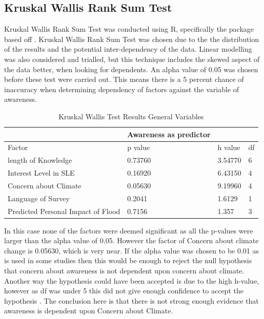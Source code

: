 \subsection{Kruskal Wallis Rank Sum Test}
Kruskal Wallis Rank Sum Test was conducted using R, specifically the package based off \cite{hollander_nonparametric_2014}. Kruskal Wallis Rank Sum Test was chosen due to the the distribution of the results and the potential inter-dependency of the data. Linear modelling was also considered and trialled, but this technique includes the skewed aspect of the data better, when looking for dependents. An alpha value of 0.05 was chosen before these test were carried out. This means there is a 5 percent chance of inaccuracy when determining dependency of factors against the variable of awareness.

\begin{table}[h!]
    \centering
    \begin{tabular}{|l|l|l|l|}
    \hline
         ~ &Awareness as predictor & ~ & ~ \\ \hline
        Factor & p value & h value & df \\ \hline
           length of Knowledge & 0.73760 & 3.54770 & 6 \\ \hline
       Interest Level in SLE & 0.16920 & 6.43150 & 4 \\ \hline
        Concern about Climate & \cellcolor[HTML]{7df9ff} 0.05630 & 9.19960 & 4 \\ \hline
        Language of Survey & 0.2041 & 1.6129 & 1 \\ \hline
        Predicted Personal Impact of Flood & 0.7156 & 1.357 & 3 \\ \hline
    \end{tabular}
    \caption{Kruskal Wallis Test Results General Variables}
    \label{Kruskal_wallis_test_general}
\end{table}

In this case none of the factors were deemed significant as all the p-values were larger than the alpha value of 0.05. However the factor of Concern about climate change is 0.05630, which is very near. If the alpha value was chosen to be 0.01 as is used in some studies \cite{hollander_nonparametric_2014} then this would be enough to reject the null hypothesis that concern about awareness is not dependent upon concern about climate. Another way the hypothesis could have been accepted is due to the high h-value, however as df was under 5 this did not give enough confidence to accept the hypothesis \cite{minitab_interpret_2022}. The conclusion here is that there is not strong enough evidence that awareness is dependent upon Concern about Climate.




